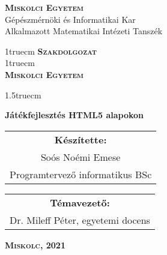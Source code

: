 

\pagestyle{empty} %

\begin{flushleft}
\textsc{\bfseries Miskolci Egyetem}\\
Gépészmérnöki és Informatikai Kar\\
Alkalmazott Matematikai Intézeti Tanszék
\end{flushleft}

{\large
\begin{center}
\vglue 1truecm
\textbf{\huge\textsc{Szakdolgozat}}\\
\vglue 1truecm
\\
\textbf{\textsc{Miskolci Egyetem}}
\end{center}}

\vglue 1.5truecm %

{\LARGE
\begin{center}
\textbf{Játékfejlesztés HTML5 alapokon}
\end{center}}

\vspace*{2.5truecm}
{\large
\begin{center}
\begin{tabular}{c}
\textbf{Készítette:}\\
Soós Noémi Emese\\
Programtervező informatikus BSc
\end{tabular}
\end{center}
\begin{center}
\begin{tabular}{c}
\textbf{Témavezető:}\\
Dr. Mileff Péter, egyetemi docens
\end{tabular}
\end{center}}
\vfill
{\large
\begin{center}
\textbf{\textsc{Miskolc, 2021}}
\end{center}}

\newpage
